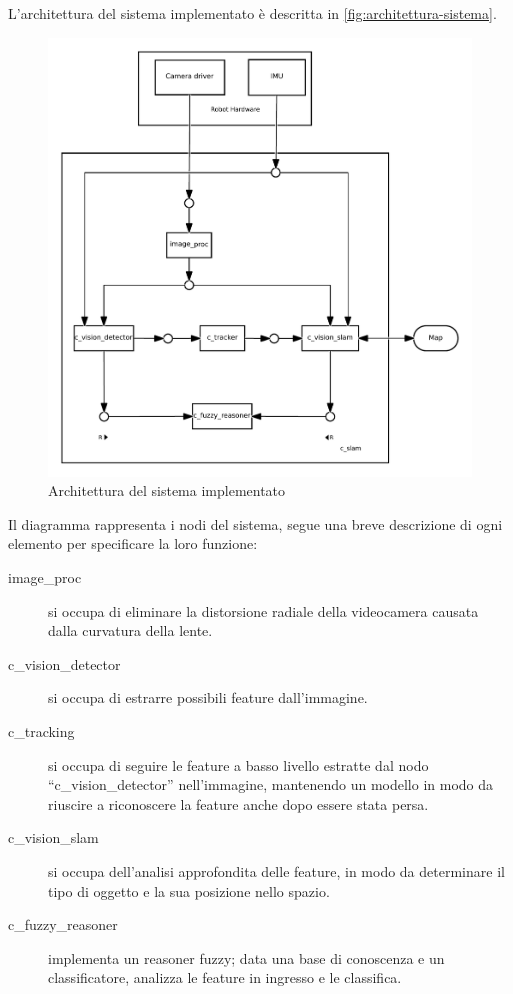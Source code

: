 L'architettura del sistema implementato è descritta in \autoref{fig:architettura-sistema}. \\
\begin{figure}[ht]
  \includegraphics[width=\textwidth]{diagrammi/Sistema}
  \caption{Architettura del sistema implementato}
  \label{fig:architettura-sistema}
\end{figure}


Il diagramma rappresenta i nodi del sistema, segue una breve descrizione di ogni elemento per specificare la loro funzione:

\begin{description}
  \item [image\_proc] si occupa di eliminare la distorsione radiale della videocamera causata dalla curvatura della lente.
  \item [c\_vision\_detector] si occupa di estrarre possibili feature dall'immagine.
  \item [c\_tracking] si occupa di seguire le feature a basso livello estratte dal nodo ``c\_vision\_detector'' nell'immagine, mantenendo un modello in modo da riuscire a riconoscere la feature anche dopo essere stata persa. 
  \item [c\_vision\_slam] si occupa dell'analisi approfondita delle feature, in modo da determinare il tipo di oggetto e la sua posizione nello spazio. 
  \item [c\_fuzzy\_reasoner] implementa un reasoner fuzzy; data una base di conoscenza e un classificatore, analizza le feature in ingresso e le classifica. 
\end{description}


